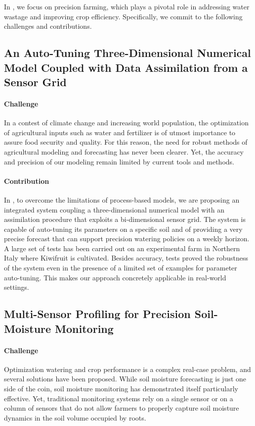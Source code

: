In , we focus on precision farming, which plays a pivotal role in addressing water wastage and improving crop efficiency. Specifically, we commit to the following challenges and contributions.

\subsection*{An Auto-Tuning Three-Dimensional Numerical Model Coupled with Data Assimilation from a Sensor Grid}

\paragraph{Challenge} In a contest of climate change and increasing world population, the optimization of agricultural inputs such as water and fertilizer is of utmost importance to assure food security and quality.
For this reason, the need for robust methods of agricultural modeling and forecasting has never been clearer.
Yet, the accuracy and precision of our modeling remain limited by current tools and methods.

\paragraph{Contribution} In , to overcome the limitations of process-based models, we are proposing an integrated system coupling a three-dimensional numerical model with an assimilation procedure that exploits a bi-dimensional sensor grid.
The system is capable of auto-tuning its parameters on a specific soil and of providing a very precise forecast that can support precision watering policies on a weekly horizon.
A large set of tests has been carried out on an experimental farm in Northern Italy where Kiwifruit is cultivated.
Besides accuracy, tests proved the robustness of the system even in the presence of a limited set of examples for parameter auto-tuning.
This makes our approach concretely applicable in real-world settings.

\subsection*{Multi-Sensor Profiling for Precision Soil-Moisture Monitoring}


\paragraph{Challenge} Optimization watering and crop performance is a complex real-case problem, and several solutions have been proposed. While soil moisture forecasting is just one side of the coin, soil moisture monitoring has demonstrated itself particularly effective.
Yet, traditional monitoring systems rely on a single sensor or on a column of sensors that do not allow farmers to properly capture soil moisture dynamics in the soil volume occupied by roots.


